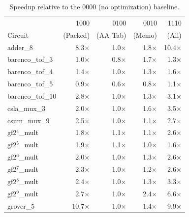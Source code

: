 \begin{table}[htbp]
\centering
\caption{Speedup relative to the 0000 (no optimization) baseline.}
\label{tab:flag_speedup}
\footnotesize
\begin{tabular}{l|r|r|r|r}
\hline
 & 1000 & 0100 & 0010 & 1110 \\
Circuit & (Packed) & (AA Tab) & (Memo) & (All) \\
\hline
adder\_8        &  8.3$\times$ & 1.0$\times$ & 1.8$\times$ & 10.4$\times$ \\
barenco\_tof\_3  &  1.0$\times$ & 0.8$\times$ & 1.7$\times$ &  1.3$\times$ \\
barenco\_tof\_4  &  1.4$\times$ & 1.0$\times$ & 1.3$\times$ &  1.6$\times$ \\
barenco\_tof\_5  &  0.9$\times$ & 0.6$\times$ & 0.8$\times$ &  1.1$\times$ \\
barenco\_tof\_10 &  2.8$\times$ & 1.0$\times$ & 1.3$\times$ &  3.1$\times$ \\
csla\_mux\_3     &  2.0$\times$ & 1.0$\times$ & 1.6$\times$ &  3.5$\times$ \\
csum\_mux\_9     &  2.5$\times$ & 1.0$\times$ & 1.1$\times$ &  2.7$\times$ \\
gf2$^4$\_mult    &  1.8$\times$ & 1.1$\times$ & 1.1$\times$ &  2.6$\times$ \\
gf2$^5$\_mult    &  1.9$\times$ & 1.1$\times$ & 1.0$\times$ &  1.6$\times$ \\
gf2$^6$\_mult    &  2.0$\times$ & 1.0$\times$ & 1.3$\times$ &  2.6$\times$ \\
gf2$^7$\_mult    &  2.3$\times$ & 1.0$\times$ & 1.2$\times$ &  2.6$\times$ \\
gf2$^8$\_mult    &  2.4$\times$ & 1.0$\times$ & 1.3$\times$ &  3.3$\times$ \\
gf2$^9$\_mult    &  2.7$\times$ & 1.0$\times$ & 2.4$\times$ &  6.6$\times$ \\
grover\_5        & 10.7$\times$ & 1.0$\times$ & 1.4$\times$ &  9.9$\times$ \\
\hline
\end{tabular}
\end{table}


